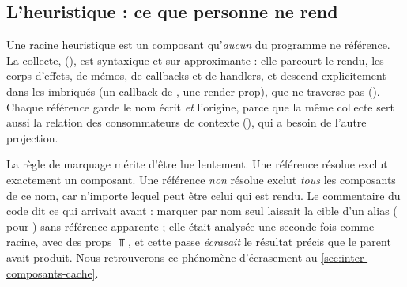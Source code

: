 \subsection{L'heuristique : ce que personne ne rend}


Une racine heuristique est un composant qu'\emph{aucun}  du programme ne
référence. La collecte,  (),
est syntaxique et sur-approximante : elle parcourt le rendu, les corps d'effets, de mémos, de
callbacks et de handlers, et descend explicitement dans les  imbriqués (un callback
de , une render prop), que  ne traverse pas
(). Chaque référence garde le nom écrit \emph{et}
l'origine, parce que la même collecte sert aussi la relation des consommateurs de contexte
(), qui a besoin de l'autre projection.

La règle de marquage mérite d'être lue lentement. Une référence résolue exclut exactement un
composant. Une référence \emph{non} résolue exclut \emph{tous} les composants de ce nom, car
n'importe lequel peut être celui qui est rendu. Le commentaire du code dit ce qui arrivait
avant  : marquer par nom seul laissait la cible d'un alias ( pour
) sans référence apparente ; elle était analysée une seconde fois comme racine,
avec des props $\Top$, et cette passe \emph{écrasait} le résultat précis que le parent avait
produit. Nous retrouverons ce phénomène d'écrasement au \cref{sec:inter-composants-cache}.

